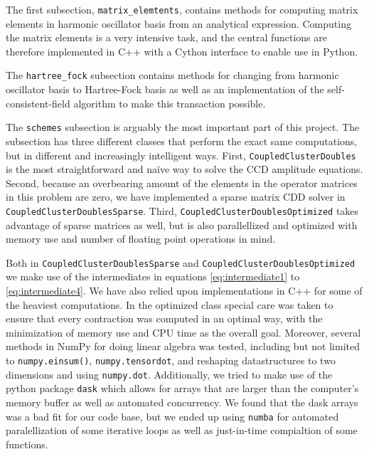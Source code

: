 \documentclass[
    a4paper, aps, twocolumn, floatfix, superscriptaddress,
    nofootinbib]{revtex4-1}
\newcommand{\1}{\mathds{1}}
\begin{document}
        The first subsection, \texttt{matrix_elemtents},
        contains methods for computing matrix elements in harmonic
        oscillator basis from an analytical
        expression\cite{anisimovas1998energy}.  Computing the matrix
        elements is a very intensive task, and the central functions are
        therefore implemented in C++ with a Cython interface to enable use
        in Python.

        The \texttt{hartree_fock} subsection contains methods
        for changing from harmonic oscillator basis to Hartree-Fock basis as
        well as an implementation of the self-consistent-field algorithm to
        make this transaction possible.

        The \texttt{schemes} subsection is arguably the most
        important part of this project. The subsection has three different
        classes that perform the exact same computations, but in different
        and increasingly intelligent ways. First,
        \texttt{CoupledClusterDoubles} is the most
        straightforward and naïve way to solve the CCD amplitude equations.
        Second, because an overbearing amount of the elements in the
        operator matrices in this problem are zero, we have implemented a
        sparse matrix CDD solver in
        \texttt{CoupledClusterDoublesSparse}. Third,
        \texttt{CoupledClusterDoublesOptimized} takes advantage
        of sparse matrices as well, but is also parallellized and optimized
        with memory use and number of floating point operations in mind.

        Both in \texttt{CoupledClusterDoublesSparse} and
        \texttt{CoupledClusterDoublesOptimized} we make use
        of the intermediates in equations \ref{eq:intermediate1} to
        \ref{eq:intermediate4}. We have also relied upon implementations
        in C++ for some of the heaviest computations. In the optimized
        class special care was taken to ensure that every contraction
        was computed in an optimal way, with the minimization of memory
        use and CPU time as the overall goal. Moreover, several methods
        in NumPy for doing linear algebra was tested, including but not limited
        to \texttt{numpy.einsum()}, \texttt{numpy.tensordot},
        and reshaping datastructures to two dimensions and using
        \texttt{numpy.dot}. Additionally, we tried to make use of
        the python package \texttt{dask} which allows for arrays that
        are larger than the computer's memory buffer as well as automated
        concurrency. We found that the dask arrays was a bad fit for our code
        base, but we ended up using \texttt{numba} for automated
        paralellization of some iterative loops as well as just-in-time
        compialtion of some functions.
\end{document}
